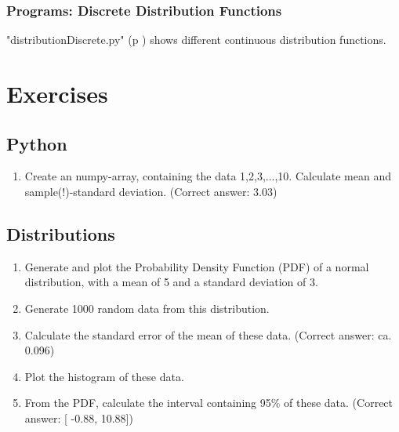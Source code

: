 \subsubsection{Programs: Discrete Distribution Functions} 

\PyImg "distributionDiscrete.py" (p \pageref{py:discrete}) shows different continuous distribution functions.

\section{Exercises}

\subsection*{Python}
\begin{enumerate}
  \item Create an numpy-array, containing the data 1,2,3,...,10. Calculate mean and sample(!)-standard deviation.
    (Correct answer: 3.03)
\end{enumerate}

\subsection*{Distributions}


\begin{enumerate}
  \item  Generate and plot the Probability Density Function (PDF) of a normal distribution, with a mean of 5 and a standard deviation of 3.
  \item  Generate 1000 random data from this distribution.
  \item  Calculate the standard error of the mean of these data.
    (Correct answer: ca. 0.096)

  \item  Plot the histogram of these data.
  \item  From the PDF, calculate the interval containing 95\% of these data.
    (Correct answer: [ -0.88, 10.88])
\end{enumerate}

